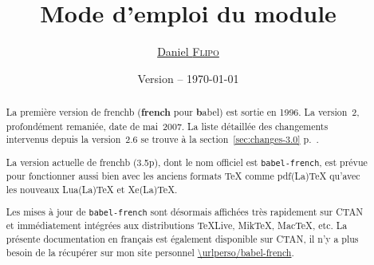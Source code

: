 \documentclass[a4paper,12pt,german,english,french]{article}
\title{Mode d’emploi du module \ext{babel-french}}
\author{\href{mailto:daniel.flipo@free.fr}{Daniel \textsc{Flipo}}}
\date{Version {\latestversion} -- \today}
\def\ColorVerb{\color{MidnightBlue}}
\newcommand*{\ext}[1]{\texttt{\ColorVerb #1}}
\newcommand*{\latestversion}{3.5p}
\begin{document}
\maketitle
\thispagestyle{empty}

\begin{abstract}
  La première version de frenchb (\textbf{french} pour \textbf{b}abel) est
  sortie en 1996.  La version~2, profondément remaniée, date de mai~2007.
  La liste détaillée des changements intervenus depuis la version~2.6 se
  trouve à la section~\ref{sec:changes-3.0} p.~\pageref{sec:changes-3.0}.

  La version actuelle de frenchb (\latestversion), dont le nom officiel est
  \ext{babel-french}, est prévue pour fonctionner aussi bien avec les anciens
  formats TeX comme pdf(La)TeX qu’avec les nouveaux Lua(La)TeX et Xe(La)TeX.

  Les mises à jour de \ext{babel-french} sont désormais affichées très
  rapidement sur CTAN et immédiatement intégrées aux distributions TeXLive,
  MikTeX, MacTeX, etc.
  La présente documentation en français est également disponible sur CTAN,
  il n’y a plus besoin de la récupérer sur mon site
  personnel {\expandafter\expandafter\expandafter\url{\urlperso/babel-french}}.
\end{abstract}
\end{document}
